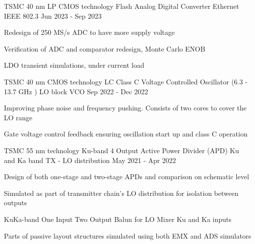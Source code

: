 


\begin{cventries}


\cventry
{TSMC 40 nm LP CMOS technology} %
{Flash Analog Digital Converter} %
{Ethernet IEEE 802.3} %
{Jun 2023 - Sep 2023} %
{ %
\begin{cvitems}
    \item {Redesign of 250 MS/s ADC to have more supply voltage}
    \item {Verification of ADC and comparator redesign, Monte Carlo ENOB}
    \item {LDO transient simulations, under current load}
\end{cvitems}
}


\cventry
{TSMC 40 nm CMOS technology} %
{LC Class C Voltage Controlled Oscillator (6.3 - 13.7 GHz )} %
{LO block VCO} %
{Sep 2022 - Dec 2022} %
{ %
\begin{cvitems}
    \item {Improving phase noise and frequency pushing. Consists of two cores to cover the LO range}
    \item {Gate voltage control feedback ensuring oscillation start up and class C operation}
\end{cvitems}
}


\cventry
{TSMC 55 nm technology} %
{Ku-band 4 Output Active Power Divider (APD)} %
{Ku and Ka band TX - LO distribution} %
{May 2021 - Apr 2022} %
{ %
\begin{cvitems}
    \item {Design of both one-stage and two-stage APDs and comparison on schematic level}
    \item {Simulated as part of transmitter chain's LO distribution for isolation between outputs}
    \item {KuKa-band One Input Two Output Balun for LO Mixer Ku and Ka inputs}
    \item {Parts of passive layout structures simulated using both EMX and ADS simulators}
\end{cvitems}
}


\end{cventries}
